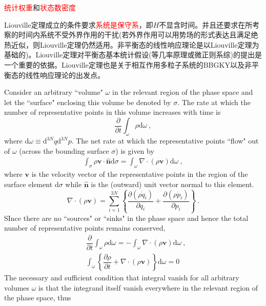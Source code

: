 \documentclass[12pt,a4paper]{article}
\renewcommand{\vec}[1]{\boldsymbol{#1}}
\newcommand{\dif}{\mathrm{d}}
\begin{document}
\textcolor{red}{统计权重}和\textcolor{red}{状态数密度}




Liouville定理成立的条件要求\textcolor{red}{系统是保守系}，即$H$不显含时间。并且还要求在所考察的时间内系统不受外界作用的干扰(若外界作用可以用势场的形式表达且满足绝热近似，则Liouville定理仍然适用。非平衡态的线性响应理论是以Liouville定理为基础的)。Liouville定理对平衡态基本统计假设(等几率原理或微正则系综)的提出是一个重要的依据。Liouville定理也是关于相互作用多粒子系统的BBGKY以及非平衡态的线性响应理论的出发点。


\cite{pathria1996statistical} Consider an arbitrary ``volume" $\omega$ in the relevant region of the phase space and let the ``surface" enclosing this volume be denoted by $\sigma$. The rate at which the number of representative points in this volume increases with time is
\begin{equation}
\dfrac{\partial }{\partial t} \int_\omega \rho \dif \omega ~,
\end{equation}
where $\dif \omega \equiv \dif^{3N} q \dif^{3N} p$. The net rate at which the representative points ``flow" out of $\omega$ (across the bounding surface $\sigma$) is given by
\begin{align}
\int_{\sigma} \rho \vec{v} \cdot \hat{\vec{n}} \dif \sigma = \int_\omega \nabla \cdot ( \rho \vec{v}) \dif \omega ~,
\end{align}
where $\vec{v}$ is the velocity vector of the representative points in the region of the surface element $\dif \sigma$ while $ \hat{\vec{n}} $ is the (outward) unit vector normal to this element.
\begin{equation*}
\nabla \cdot ( \rho \vec{v}) = \sum_{i=1}^{3N} \left\{\dfrac{\partial (\rho \dot{q}_i)}{\partial q_i} +\dfrac{\partial (\rho \dot{p}_i)}{\partial p_i} \right\} ~.
\end{equation*}
SInce there are no ``sources" or ``sinks" in the phase space and hence the total number of representative points remains conserved,
\begin{align}
& \dfrac{\partial }{\partial t} \int_\omega \rho \dif \omega = - \int_\omega \nabla \cdot ( \rho \vec{v}) \dif \omega ~,  \\
& \int_\omega \left\{\dfrac{\partial \rho}{\partial t} + \nabla \cdot ( \rho \vec{v})\right\} \dif \omega = 0
\end{align}
The necessary and sufficient condition that integral vanish for all arbitrary volumes $\omega$ is that the integrand itself vanish everywhere in the relevant region of the phase space, thus
\end{document}
